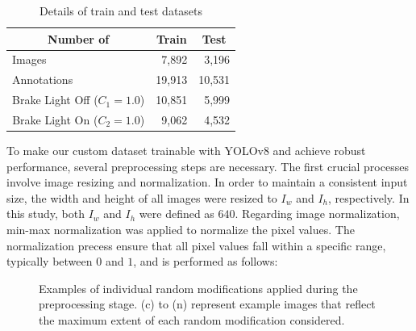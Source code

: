 \begin{table}[h]
    \caption{Details of train and test datasets}
    \label{tab:dataset}
    \begin{tabular}{p{5cm} p{5cm} p{5cm}}
    \toprule
    \multicolumn{1}{c}{Number of}                          & \multicolumn{1}{c}{Train} & \multicolumn{1}{c}{Test} \\
    \midrule
    Images                              & \multicolumn{1}{r}{7,892}                     & \multicolumn{1}{r}{3,196}                    \\
    Annotations                         & \multicolumn{1}{r}{19,913}                    & \multicolumn{1}{r}{10,531}                   \\
    \multicolumn{1}{c}{Brake Light Off ($C_{1}=1.0$)} & \multicolumn{1}{r}{10,851}                    & \multicolumn{1}{r}{5,999}                    \\
    \multicolumn{1}{c}{Brake Light On ($C_{2}=1.0$)}  & \multicolumn{1}{r}{9,062}                     & \multicolumn{1}{r}{4,532}                   \\
    \bottomrule
    \end{tabular}%
\end{table}





To make our custom dataset trainable with YOLOv8 and achieve robust performance, several preprocessing steps are necessary.
The first crucial processes involve image resizing and normalization.
In order to maintain a consistent input size, the width and height of all images were resized to $I_{w}$ and $I_{h}$, respectively. 
In this study, both $I_{w}$ and $I_{h}$ were defined as $640$.
Regarding image normalization, min-max normalization was applied to normalize the pixel values.
The normalization precess ensure that all pixel values fall within a specific range, typically between $0$ and $1$, and is performed as follows:

\begin{figure}[b!]%

    \hfill

\caption{Examples of individual random modifications applied during the preprocessing stage. (c) to (n) represent example images that reflect the maximum extent of each random modification considered.}
\label{fig:random}%
\end{figure}

